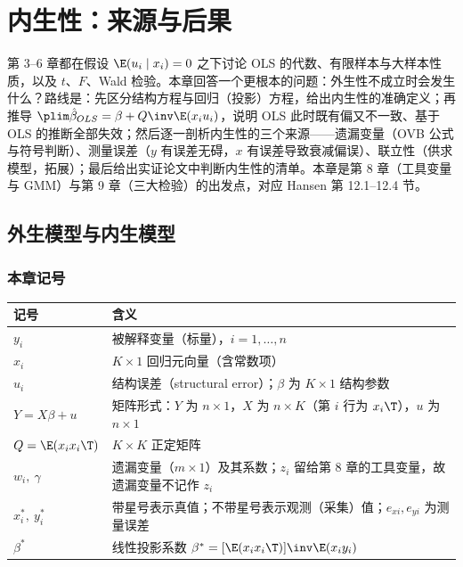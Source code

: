 \chapter{内生性：来源与后果}
\label{ch:U07-endog}

第 3--6 章都在假设 $\E(u_i\mid x_i)=0$ 之下讨论 OLS 的代数、有限样本与大样本性质，以及 $t$、$F$、Wald 检验。本章回答一个更根本的问题：外生性不成立时会发生什么？路线是：先区分结构方程与回归（投影）方程，给出内生性的准确定义；再推导 $\plim\hat\beta_{OLS}=\beta+Q\inv\E(x_iu_i)$，说明 OLS 此时既有偏又不一致、基于 OLS 的推断全部失效；然后逐一剖析内生性的三个来源——遗漏变量（OVB 公式与符号判断）、测量误差（$y$ 有误差无碍，$x$ 有误差导致衰减偏误）、联立性（供求模型，拓展）；最后给出实证论文中判断内生性的清单。本章是第 8 章（工具变量与 GMM）与第 9 章（三大检验）的出发点，对应 Hansen 第 12.1--12.4 节。

\section{外生模型与内生模型}\label{sec:U07-model}

\subsection{本章记号}

\begin{center}
\small
\begin{tabularx}{\linewidth}{lL}
\toprule
记号 & 含义\\
\midrule
$y_i$ & 被解释变量（标量），$i=1,\dots,n$\\
$x_i$ & $K\times1$ 回归元向量（含常数项）\\
$u_i$ & 结构误差（structural error）；$\beta$ 为 $K\times1$ 结构参数\\
$Y=X\beta+u$ & 矩阵形式：$Y$ 为 $n\times1$，$X$ 为 $n\times K$（第 $i$ 行为 $x_i\T$），$u$ 为 $n\times1$\\
$Q=\E(x_ix_i\T)$ & $K\times K$ 正定矩阵\\
$w_i,\ \gamma$ & 遗漏变量（$m\times1$）及其系数；$z_i$ 留给第 8 章的工具变量，故遗漏变量不记作 $z_i$\\
$x_i^*,\ y_i^*$ & 带星号表示真值；不带星号表示观测（采集）值；$e_{xi},e_{yi}$ 为测量误差\\
$\beta^*$ & 线性投影系数 $\beta^*=[\E(x_ix_i\T)]\inv\E(x_iy_i)$\\
\bottomrule
\end{tabularx}
\end{center}

